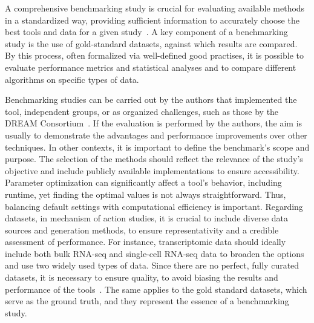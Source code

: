 A comprehensive benchmarking study is crucial for evaluating available methods in a standardized way, providing sufficient information to accurately choose the best tools and data for a given study~\cite{RN108}. A key component of a benchmarking study is the use of gold-standard datasets, against which results are compared. By this process, often formalized via well-defined good practises, it is possible to evaluate performance metrics and statistical analyses and to compare different algorithms on specific types of data. 

Benchmarking studies can be carried out by the authors that implemented the tool, independent groups, or as organized challenges, such as those by the \gls{DREAM} Consortium~\cite{RN109}. If the evaluation is performed by the authors, the aim is usually to demonstrate the advantages and performance improvements over other techniques. In other contexts, it is important to define the benchmark's scope and purpose. The selection of the methods should reflect the relevance of the study's objective and include publicly available implementations to ensure accessibility. Parameter optimization can significantly affect a tool's behavior, including runtime, yet finding the optimal values is not always straightforward. Thus, balancing default settings with computational efficiency is important. Regarding datasets, in mechanism of action studies, it is crucial to include diverse data sources and generation methods, to ensure representativity and a credible assessment of performance. For instance, transcriptomic data should ideally include both bulk RNA-seq and single-cell RNA-seq data to broaden the options and use two widely used types of data. Since there are no perfect, fully curated datasets, it is necessary to ensure quality, to avoid biasing the results and performance of the tools~\cite{RN109}. The same applies to the gold standard datasets, which serve as the ground truth, and they represent the essence of a benchmarking study.

